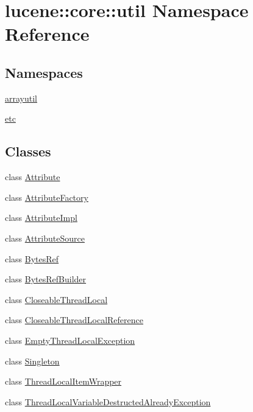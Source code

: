 \hypertarget{namespacelucene_1_1core_1_1util}{}\section{lucene\+:\+:core\+:\+:util Namespace Reference}
\label{namespacelucene_1_1core_1_1util}
\subsection*{Namespaces}
\begin{DoxyCompactItemize}
\item 
 \mbox{\hyperlink{namespacelucene_1_1core_1_1util_1_1arrayutil}{arrayutil}}
\item 
 \mbox{\hyperlink{namespacelucene_1_1core_1_1util_1_1etc}{etc}}
\end{DoxyCompactItemize}
\subsection*{Classes}
\begin{DoxyCompactItemize}
\item 
class \mbox{\hyperlink{classlucene_1_1core_1_1util_1_1Attribute}{Attribute}}
\item 
class \mbox{\hyperlink{classlucene_1_1core_1_1util_1_1AttributeFactory}{Attribute\+Factory}}
\item 
class \mbox{\hyperlink{classlucene_1_1core_1_1util_1_1AttributeImpl}{Attribute\+Impl}}
\item 
class \mbox{\hyperlink{classlucene_1_1core_1_1util_1_1AttributeSource}{Attribute\+Source}}
\item 
class \mbox{\hyperlink{classlucene_1_1core_1_1util_1_1BytesRef}{Bytes\+Ref}}
\item 
class \mbox{\hyperlink{classlucene_1_1core_1_1util_1_1BytesRefBuilder}{Bytes\+Ref\+Builder}}
\item 
class \mbox{\hyperlink{classlucene_1_1core_1_1util_1_1CloseableThreadLocal}{Closeable\+Thread\+Local}}
\item 
class \mbox{\hyperlink{classlucene_1_1core_1_1util_1_1CloseableThreadLocalReference}{Closeable\+Thread\+Local\+Reference}}
\item 
class \mbox{\hyperlink{classlucene_1_1core_1_1util_1_1EmptyThreadLocalException}{Empty\+Thread\+Local\+Exception}}
\item 
class \mbox{\hyperlink{classlucene_1_1core_1_1util_1_1Singleton}{Singleton}}
\item 
class \mbox{\hyperlink{classlucene_1_1core_1_1util_1_1ThreadLocalItemWrapper}{Thread\+Local\+Item\+Wrapper}}
\item 
class \mbox{\hyperlink{classlucene_1_1core_1_1util_1_1ThreadLocalVariableDestructedAlreadyException}{Thread\+Local\+Variable\+Destructed\+Already\+Exception}}
\end{DoxyCompactItemize}
